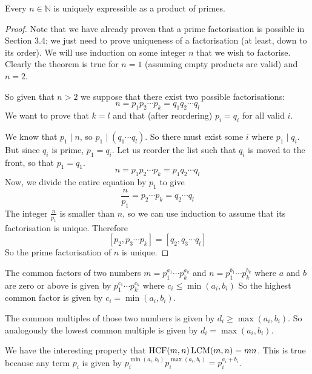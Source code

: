 \begin{theorem}
	Every \(n \in \mathbb N\) is uniquely expressible as a product of primes.
\end{theorem}
\begin{proof}
	Note that we have already proven that a prime factorisation is possible in Section 3.4; we just need to prove uniqueness of a factorisation (at least, down to its order).
	We will use induction on some integer \(n\) that we wish to factorise.
	Clearly the theorem is true for \(n=1\) (assuming empty products are valid) and \(n=2\).

	So given that \(n > 2\) we suppose that there exist two possible factorisations:
	\[
		n = p_1 p_2 \cdots p_k = q_1 q_2 \cdots q_l
	\]
	We want to prove that \(k=l\) and that (after reordering) \(p_i = q_i\) for all valid \(i\).

	We know that \(p_1 \mid n\), so \(p_1 \mid (q_1 \cdots q_l)\).
	So there must exist some \(i\) where \(p_1 \mid q_i\).
	But since \(q_i\) is prime, \(p_1 = q_i\).
	Let us reorder the list such that \(q_i\) is moved to the front, so that \(p_1 = q_1\).
	\[
		n = p_1 p_2 \cdots p_k = p_1 q_2 \cdots q_l
	\]
	Now, we divide the entire equation by \(p_1\) to give
	\[
		\frac{n}{p_1} = p_2 \cdots p_k = q_2 \cdots q_l
	\]
	The integer \(\frac{n}{p_1}\) is smaller than \(n\), so we can use induction to assume that its factorisation is unique.
	Therefore
	\[
		[p_2, p_3 \cdots p_k] = [q_2, q_3 \cdots q_l]
	\]
	So the prime factorisation of \(n\) is unique.
\end{proof}

The common factors of two numbers \(m = p_1^{a_1} \cdots p_k^{a_k}\) and \(n = p_1^{b_1} \cdots p_k^{b_k}\) where \(a\) and \(b\) are zero or above is given by \(p_1^{c_1} \cdots p_k^{c_k}\) where \(c_i \leq \min(a_i, b_i)\) So the highest common factor is given by \(c_i = \min(a_i, b_i)\).

The common multiples of those two numbers is given by \(d_i \geq \max(a_i, b_i)\).
So analogously the lowest common multiple is given by \(d_i = \max(a_i, b_i)\).

We have the interesting property that \(\operatorname{HCF}(m, n) \operatorname{LCM}(m, n) = mn\).
This is true because any term \(p_i\) is given by \(p_i^{\min(a_i, b_i)}p_i^{\max(a_i, b_i)} = p_i^{a_i + b_i}\).
